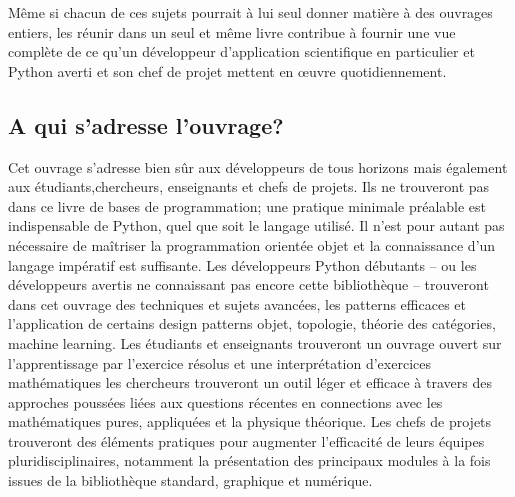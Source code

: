 Même si chacun de ces sujets pourrait à lui seul donner matière à des ouvrages entiers, les réunir dans 
un seul et même livre contribue à fournir une vue complète de ce qu’un développeur d'application 
scientifique en particulier et Python averti et son chef de projet mettent en œuvre quotidiennement.

\subsection*{A qui s'adresse l'ouvrage?}
Cet ouvrage s’adresse bien sûr aux développeurs de tous horizons mais également aux
étudiants,chercheurs, enseignants et chefs de projets. Ils ne trouveront pas dans ce livre de bases de 
programmation; une pratique minimale préalable est indispensable de Python, quel que soit le langage 
utilisé. Il n’est pour autant pas nécessaire de maîtriser la programmation orientée objet et 
la connaissance d’un langage impératif est suffisante.
Les développeurs Python débutants – ou les développeurs avertis ne connaissant pas
encore cette bibliothèque – trouveront dans cet ouvrage des techniques et sujets avancées, les patterns 
efficaces et l’application de certains design patterns objet, topologie, théorie des catégories, machine
learning.
Les étudiants et enseignants trouveront un ouvrage ouvert sur l'apprentissage par l'exercice résolus et 
une interprétation d’exercices mathématiques  
les chercheurs trouveront un outil léger et efficace à travers des approches poussées liées aux 
questions récentes en connections avec les mathématiques pures, appliquées et la physique théorique.
Les chefs de projets trouveront des éléments pratiques pour augmenter l’efficacité de
leurs équipes pluridisciplinaires, notamment la présentation des principaux modules à la fois issues de la bibliothèque standard, graphique et numérique.
